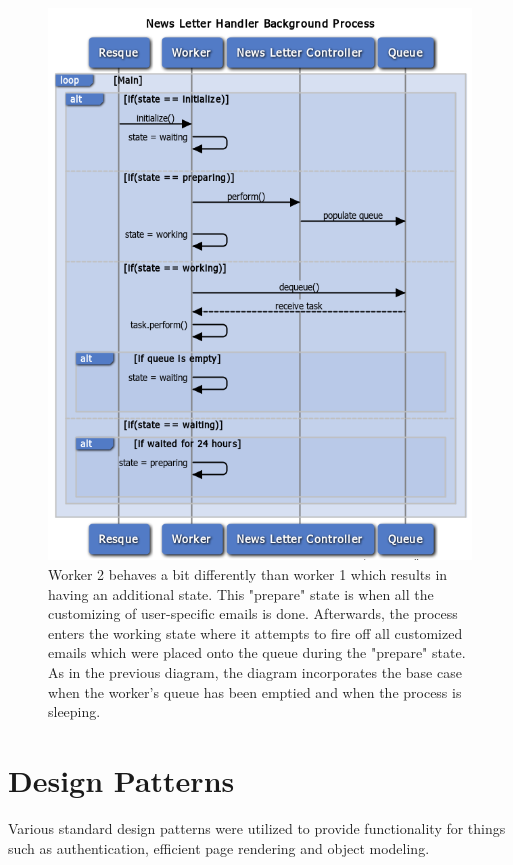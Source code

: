 \begin{figure}[H]
\centering
\includegraphics[width=5.5in]{./Diagrams/ComponentModels/stateMachineDiagrams/Worker2/worker2.png}
\caption{Worker 2 behaves a bit differently than worker 1 which results in having an additional state. This "prepare" state is when all the customizing of user-specific emails is done. Afterwards, the process enters the working state where it attempts to fire off all customized emails which were placed onto the queue during the "prepare" state. As in the previous diagram, the diagram incorporates the base case when the worker's queue has been emptied and when the process is sleeping.}
\end{figure}

\section{Design Patterns}
Various standard design patterns were utilized to provide functionality for things such as authentication, efficient page rendering and object modeling.
